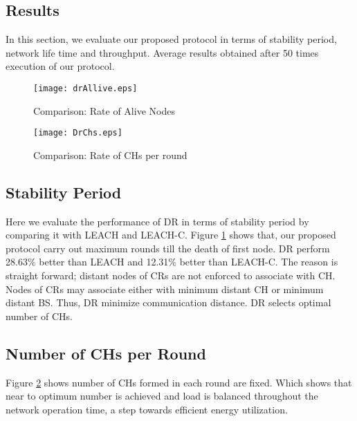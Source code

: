 \documentclass[3p,times,procedia]{elsarticle}
\begin{document}
\subsection{Results}        In this section, we evaluate our proposed protocol in terms of stability period, network life time and throughput. Average results obtained after 50 times execution of our protocol.


\begin{figure}[t]       \centering
\texttt{[image: drAllive.eps]}
\caption{Comparison: Rate of Alive Nodes}
\label{drAllive}
\end{figure}



\begin{figure}[H]       \centering
\texttt{[image: DrChs.eps]}
\caption{Comparison: Rate of CHs per round}
\label{DrChs}
\end{figure}

\subsection{Stability Period}    Here we evaluate the performance of DR in terms of stability period by comparing it with LEACH and LEACH-C. Figure \ref{drAllive} shows that, our proposed protocol carry out maximum rounds till the death of first node. DR perform 28.63$\%$ better than LEACH and 12.31$\%$ better than LEACH-C. The reason is straight forward; distant nodes of CRs are not enforced to associate with CH. Nodes of CRs may associate either with minimum distant CH or minimum distant BS. Thus, DR minimize communication distance. DR selects optimal number of CHs.

\subsection{Number of CHs per Round}
Figure \ref{DrChs} shows number of CHs formed in each round are fixed. Which shows that near to optimum number is achieved and load is balanced throughout the network operation time, a step towards efficient energy utilization.
\end{document}

